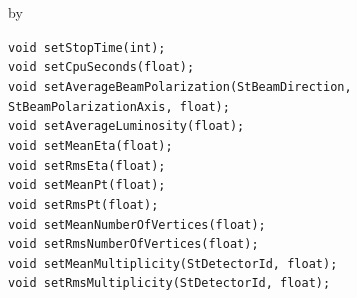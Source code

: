 \documentclass[twoside]{article}
\newcommand{\entrylabel}[1]{\mbox{\textbf{{#1}}}\hfil}%
\newenvironment{entry}
{\begin{list}{}%
    {\renewcommand{\makelabel}{\entrylabel}%
     \setlength{\labelwidth}{90pt}%
     \setlength{\leftmargin}{\labelwidth}
     \advance\leftmargin by \labelsep%
      }%
    }%
  {\end{list}}
\newcommand{\Entrylabel}[1]%
{\raisebox{0pt}[1ex][0pt]{\makebox[\labelwidth][l]%
    {\parbox[t]{\labelwidth}{\hspace{0pt}\textbf{{#1}}}}}}
\newenvironment{Entry}%
{\renewcommand{\entrylabel}{\Entrylabel}\begin{entry}}%
  {\end{entry}}
\begin{document}
\begin{Entry}
    \verb+void setStopTime(int);+\\
    \verb+void setCpuSeconds(float);+\\
    \verb+void setAverageBeamPolarization(StBeamDirection, StBeamPolarizationAxis, float);+\\
    \verb+void setAverageLuminosity(float);+\\
    \verb+void setMeanEta(float);+\\
    \verb+void setRmsEta(float);+\\
    \verb+void setMeanPt(float);+\\
    \verb+void setRmsPt(float);+\\
    \verb+void setMeanNumberOfVertices(float);+\\
    \verb+void setRmsNumberOfVertices(float);+\\
    \verb+void setMeanMultiplicity(StDetectorId, float);+\\
    \verb+void setRmsMultiplicity(StDetectorId, float);+\\
\end{Entry}
\clearpage
\end{document}
